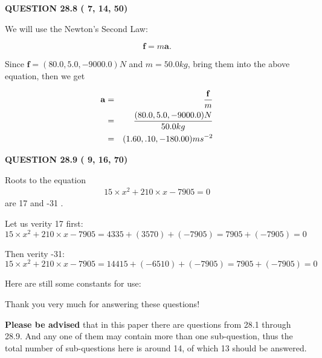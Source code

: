 \documentclass[12pt]{article}
\begin{document}
  
\vspace{0.2in}
  
{\textbf{\Large{QUESTION
28.8 
 (          7,         14,         50)
}}}
  
  
 
 

We will use the Newton's Second Law:
 
\[
\mathbf{f}=m\mathbf{a}.
\]
 
Since $\mathbf{f}= %
(80.0 , 5.0 , -9000.0) N$
and $m= %
50.0kg$, bring them into the above equation, then we get
 
\begin{eqnarray*}
\mathbf{a}&=&\frac{\mathbf{f}}m  \\
&=&\frac{ %
(80.0 , 5.0 , -9000.0) N}{ %
50.0kg}  \\
&=& %
(1.60 , .10 , -180.00) ms^{-2}
\end{eqnarray*}
 
 
 
  
\vspace{0.2in}
  
{\textbf{\Large{QUESTION
28.9 
 (          9,         16,         70)
}}}
  
  


 
 

Roots to the equation
\begin{eqnarray*}
15 \times x^2  %
+  %
210
                 \times x    %
-7905 =0
\end{eqnarray*}
are  %
17 and  %
-31 .
 
Let us verity  %
17 first:
$  %
15 \times x^2  %
+  %
210
                 \times x    %
-7905
  = %
4335+( %
3570)+( %
-7905)
  = %
7905+( %
-7905)
  = %
0
$
 
Then verity  %
-31:
$  %
15 \times x^2  %
+  %
210
                 \times x    %
-7905
  = %
14415+( %
-6510)+( %
-7905)
  = %
7905+( %
-7905)
  = %
0
$
 
 
 
   
   
 \vspace{0.2in}
Here are still some constants for use:
 
 
 
 
Thank you very much for answering these questions!
 
{\textbf{\large{Please be advised}}} that in this paper there are questions from
28.1 through
28.9.
And any one of them may contain more than one sub-question, thus the total number
of sub-questions here is around 14, of which
13 should be answered.
 
\end{document}
